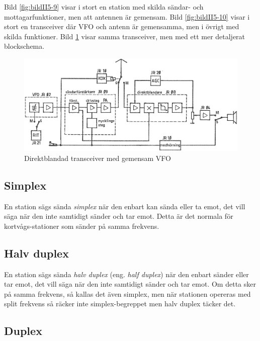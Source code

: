 Bild \ref{fig:bildII5-9} visar i stort en station med skilda sändar- och
mottagarfunktioner, men att antennen är gemensam.
Bild \ref{fig:bildII5-10} visar i stort en transceiver där VFO och antenn är
gemensamma, men i övrigt med skilda funktioner.
Bild \ref{fig:bildII5-11} visar samma transceiver, men med ett mer detaljerat
blockschema.

\begin{figure}
  \includegraphics[width=\textwidth]{images/cropped_pdfs/bild_2_5-11.pdf}
  \caption{Direktblandad transceiver med gemensam VFO}
  \label{fig:bildII5-11}
\end{figure}

\subsection{Simplex}

En station sägs sända \emph{simplex} när den enbart kan sända eller ta emot,
det vill säga när den inte samtidigt sänder och tar emot.
Detta är det normala för kortvågs-stationer som sänder på samma frekvens.

\subsection{Halv duplex}

En station sägs sända \emph{halv duplex} (eng. \emph{half duplex}) när den
enbart sänder eller tar emot, det vill säga när den inte samtidigt sänder och
tar emot.
Om detta sker på samma frekvens, så kallas det även simplex, men när stationen
opereras med split frekvens så räcker inte simplex-begreppet men halv duplex
täcker det.

\subsection{Duplex}

